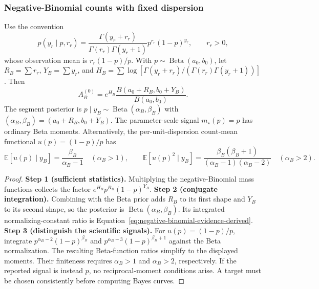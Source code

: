 \subsubsection{Negative-Binomial counts with fixed dispersion}
\begin{proposition}
\label{prop:negative-binomial-family}
Use the convention
\[
p(y_r\mid p,r_r)=\frac{\Gamma(y_r+r_r)}{\Gamma(r_r)\Gamma(y_r+1)}
 p^{r_r}(1-p)^{y_r},\qquad r_r>0,
\]
whose observation mean is $r_r(1-p)/p$. With $p\sim\operatorname{Beta}(a_0,b_0)$, let $R_B=\sum r_r$, $Y_B=\sum y_r$, and $H_B=\sum\log[\Gamma(y_r+r_r)/(\Gamma(r_r)\Gamma(y_r+1))]$. Then
\begin{equation}
A^{(0)}_B=e^{H_B}\frac{B(a_0+R_B,b_0+Y_B)}{B(a_0,b_0)}.
\label{eq:negative-binomial-evidence-derived}
\end{equation}
The segment posterior is $p\mid y_B\sim\operatorname{Beta}(\alpha_B,\beta_B)$ with $(\alpha_B,\beta_B)=(a_0+R_B,b_0+Y_B)$. The parameter-scale signal $m_\star(p)=p$ has ordinary Beta moments. Alternatively, the per-unit-dispersion count-mean functional $u(p)=(1-p)/p$ has
\[
\mathbb E[u(p)\mid y_B]=\frac{\beta_B}{\alpha_B-1}\quad(\alpha_B>1),\qquad
\mathbb E[u(p)^2\mid y_B]=\frac{\beta_B(\beta_B+1)}{(\alpha_B-1)(\alpha_B-2)}\quad(\alpha_B>2).
\]
\end{proposition}
\begin{proof}
\textbf{Step 1 (sufficient statistics).}
Multiplying the negative-Binomial mass functions collects the factor $e^{H_B}p^{R_B}(1-p)^{Y_B}$.
\textbf{Step 2 (conjugate integration).}
Combining with the Beta prior adds $R_B$ to its first shape and $Y_B$ to its second shape, so the posterior is $\operatorname{Beta}(\alpha_B,\beta_B)$. Its integrated normalizing-constant ratio is Equation~\eqref{eq:negative-binomial-evidence-derived}.
\textbf{Step 3 (distinguish the scientific signals).}
For $u(p)=(1-p)/p$, integrate $p^{\alpha_B-2}(1-p)^{\beta_B}$ and $p^{\alpha_B-3}(1-p)^{\beta_B+1}$ against the Beta normalization. The resulting Beta-function ratios simplify to the displayed moments. Their finiteness requires $\alpha_B>1$ and $\alpha_B>2$, respectively. If the reported signal is instead $p$, no reciprocal-moment conditions arise. A target must be chosen consistently before computing Bayes curves.
\end{proof}

